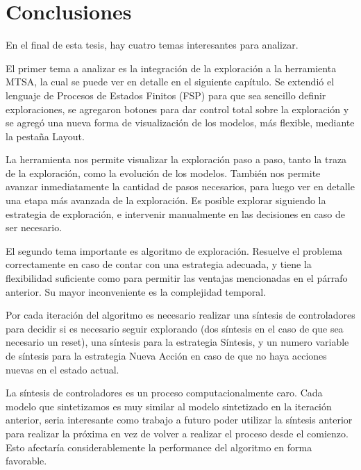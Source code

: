 \chapter{Conclusiones}

En el final de esta tesis, hay cuatro temas interesantes para analizar.

\vspace{\baselineskip}
El primer tema a analizar es la integración de la exploración a la herramienta MTSA, la cual se puede ver en detalle en el
siguiente capítulo.
Se extendió el lenguaje de Procesos de Estados Finitos (FSP) para que sea sencillo definir exploraciones, se agregaron botones
para dar control total sobre la exploración y se agregó una nueva forma de visualización de los modelos, más flexible, mediante
la pestaña Layout.

\vspace{\baselineskip}
La herramienta nos permite visualizar la exploración paso a paso, tanto la traza de la exploración, como la
evolución de los modelos. También nos permite avanzar inmediatamente la cantidad de pasos necesarios, para luego ver en detalle
una etapa más avanzada de la exploración. Es posible explorar siguiendo la estrategia de exploración, e intervenir manualmente
en las decisiones en caso de ser necesario.

\vspace{\baselineskip}
El segundo tema importante es algoritmo de exploración. Resuelve el problema correctamente en caso de contar con una estrategia
adecuada, y tiene la flexibilidad suficiente como para permitir las ventajas mencionadas en el párrafo anterior. Su mayor
inconveniente es la complejidad temporal.

\vspace{\baselineskip}
Por cada iteración del algoritmo es necesario realizar una síntesis de controladores para decidir si es necesario seguir explorando
(dos síntesis en el caso de que sea necesario un reset), una síntesis para la estrategia Síntesis, y un numero variable de síntesis
para la estrategia Nueva Acción en caso de que no haya acciones nuevas en el estado actual.

\vspace{\baselineskip}
La síntesis de controladores es un proceso computacionalmente caro. Cada modelo que sintetizamos es muy similar al modelo sintetizado
en la iteración anterior, seria interesante como trabajo a futuro poder utilizar la síntesis anterior para realizar la próxima en
vez de volver a realizar el proceso desde el comienzo. Esto afectaría considerablemente la performance del algoritmo en forma favorable.

